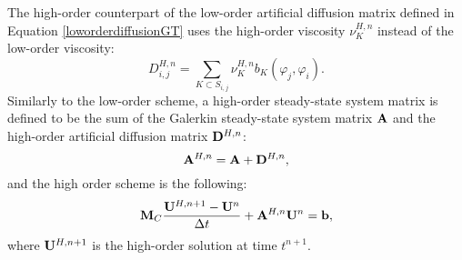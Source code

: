 The high-order counterpart of the low-order artificial diffusion matrix defined
in Equation \eqref{loworderdiffusionGT} uses the high-order viscosity $\nu_K^{H,n}$
instead of the low-order viscosity:
\begin{equation}
   D^{H,n}_{i,j} = \sum\limits_{K\subset S_{i,j}}\nu_K^{H,n} b_K(\varphi_j,\varphi_i).
\end{equation}
Similarly to the low-order scheme, a high-order steady-state system matrix is
defined to be the sum of the Galerkin steady-state system matrix $\mathbf{A}$ and the
high-order artificial diffusion matrix $\mathbf{D}^{H,n}$:
\begin{equation}
   \mathbf{A}^{H,n} = \mathbf{A} + \mathbf{D}^{H,n},
\end{equation}
and the high order scheme is the following:
\begin{equation}\label{gthighorderscheme}
   \mathbf{M}_C\frac{\mathbf{U}^{H,n+1}-\mathbf{U}^n}{\Delta t}
      +\mathbf{A}^{H,n}\mathbf{U}^n = \mathbf{b},
\end{equation}
where $\mathbf{U}^{H,n+1}$ is the high-order solution at time $t^{n+1}$.
